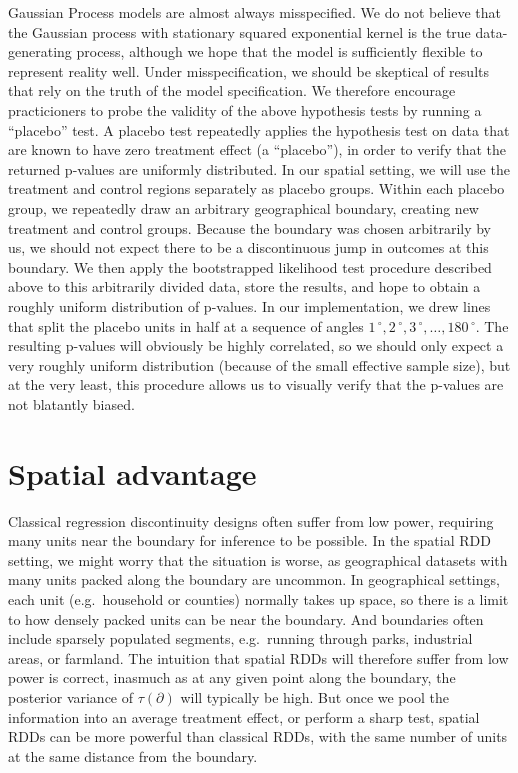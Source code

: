 \documentclass[letter]{article}
\newcommand{\boundary}{\partial}
\newcommand{\degree}{{\,^\circ}}
\begin{document}
Gaussian Process models are almost always misspecified. We do not
believe that the Gaussian process with stationary squared exponential
kernel is the true data-generating process, although we hope that the
model is sufficiently flexible to represent reality well. Under
misspecification, we should be skeptical of results that rely on the
truth of the model specification. We therefore encourage practicioners
to probe the validity of the above hypothesis tests by running a
``placebo'' test. A placebo test repeatedly applies the hypothesis test
on data that are known to have zero treatment effect (a ``placebo''), in
order to verify that the returned p-values are uniformly distributed. In
our spatial setting, we will use the treatment and control regions
separately as placebo groups. Within each placebo group, we repeatedly
draw an arbitrary geographical boundary, creating new treatment and
control groups. Because the boundary was chosen arbitrarily by us, we
should not expect there to be a discontinuous jump in outcomes at this
boundary. We then apply the bootstrapped likelihood test procedure
described above to this arbitrarily divided data, store the results, and
hope to obtain a roughly uniform distribution of p-values. In our
implementation, we drew lines that split the placebo units in half at a
sequence of angles \(1\degree,2\degree,3\degree,\ldots,180\degree\). The
resulting p-values will obviously be highly correlated, so we should
only expect a very roughly uniform distribution (because of the small
effective sample size), but at the very least, this procedure allows us
to visually verify that the p-values are not blatantly biased.
    


    	\section{Spatial advantage}\label{spatial-advantage}

Classical regression discontinuity designs often suffer from low power,
requiring many units near the boundary for inference to be possible. In
the spatial RDD setting, we might worry that the situation is worse, as
geographical datasets with many units packed along the boundary are
uncommon. In geographical settings, each unit (e.g.~household or
counties) normally takes up space, so there is a limit to how densely
packed units can be near the boundary. And boundaries often include
sparsely populated segments, e.g.~running through parks, industrial
areas, or farmland. The intuition that spatial RDDs will therefore
suffer from low power is correct, inasmuch as at any given point along
the boundary, the posterior variance of \(\tau(\boundary)\) will
typically be high. But once we pool the information into an average
treatment effect, or perform a sharp test, spatial RDDs can be more
powerful than classical RDDs, with the same number of units at the same
distance from the boundary.
\end{document}

